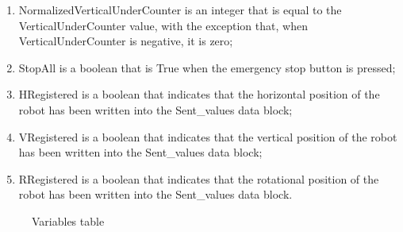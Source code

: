 \begin{enumerate}
    \item NormalizedVerticalUnderCounter is an integer that is equal to the VerticalUnderCounter value, with the exception that, when VerticalUnderCounter is negative, it is zero;
    \item StopAll is a boolean that is True when the emergency stop button is pressed;
    \item HRegistered is a boolean that indicates that the horizontal position of the robot has been written into the Sent\_values data block;
    \item VRegistered is a boolean that indicates that the vertical position of the robot has been written into the Sent\_values data block;
    \item RRegistered is a boolean that indicates that the rotational position of the robot has been written into the Sent\_values data block.
\end{enumerate}

\begin{figure}[!h]
\centering
{}
\qquad
{}
\caption{Variables table}
\label{variables_table}
\end{figure}

